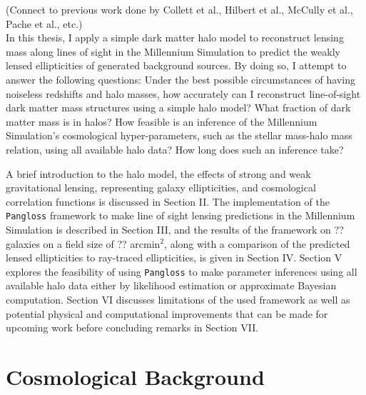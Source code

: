\documentclass[%
 reprint,
 amsmath,amssymb,
 aps,nofootinbib
]{revtex4-1}
\begin{document}
(Connect to previous work done by Collett et al., Hilbert et al., McCully et al., Pache et al., etc.)\\


In this thesis, I apply a simple dark matter halo model to reconstruct lensing mass along lines of sight in the Millennium Simulation to predict the weakly lensed ellipticities of generated background sources. By doing so, I attempt to answer the following questions: Under the best possible circumstances of having noiseless redshifts and halo masses, how accurately can I reconstruct line-of-sight dark matter mass structures using a simple halo model? What fraction of dark matter mass is in halos? How feasible is an inference of the Millennium Simulation's cosmological hyper-parameters, such as the stellar mass-halo mass relation, using all available halo data? How long does such an inference take?

A brief introduction to the halo model, the effects of strong and weak gravitational lensing, representing galaxy ellipticities, and cosmological correlation functions is discussed in Section II. The implementation of the \texttt{Pangloss} framework to make line of sight lensing predictions in the Millennium Simulation is described in Section III, and the results of the framework on ?? galaxies on a field size of ?? arcmin$^2$, along with a comparison of the predicted lensed ellipticities to ray-traced ellipticities, is given in Section IV. Section V explores the feasibility of using \texttt{Pangloss} to make parameter inferences using all available halo data either by likelihood estimation or approximate Bayesian computation. Section VI discusses limitations of the used framework as well as potential physical and computational improvements that can be made for upcoming work before concluding remarks in Section VII.

\section{Cosmological Background} \label{background}
\end{document}

